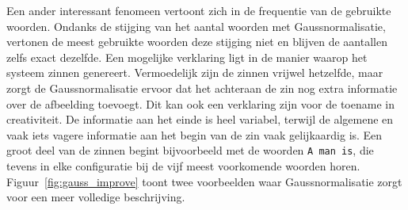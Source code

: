Een ander interessant fenomeen vertoont zich in de frequentie van de gebruikte woorden. Ondanks de stijging van het aantal woorden met Gaussnormalisatie, vertonen de meest gebruikte woorden deze stijging niet en blijven de aantallen zelfs exact dezelfde. Een mogelijke verklaring ligt in de manier waarop het systeem zinnen genereert. Vermoedelijk zijn de zinnen vrijwel hetzelfde, maar zorgt de Gaussnormalisatie ervoor dat het achteraan de zin nog extra informatie over de afbeelding toevoegt. Dit kan ook een verklaring zijn voor de toename in creativiteit. De informatie aan het einde is heel variabel, terwijl de algemene en vaak iets vagere informatie aan het begin van de zin vaak gelijkaardig is. Een groot deel van de zinnen begint bijvoorbeeld met de woorden \texttt{A man is}, die tevens in elke configuratie bij de vijf meest voorkomende woorden horen. Figuur~\ref{fig:gauss_improve} toont twee voorbeelden waar Gaussnormalisatie zorgt voor een meer volledige beschrijving.

